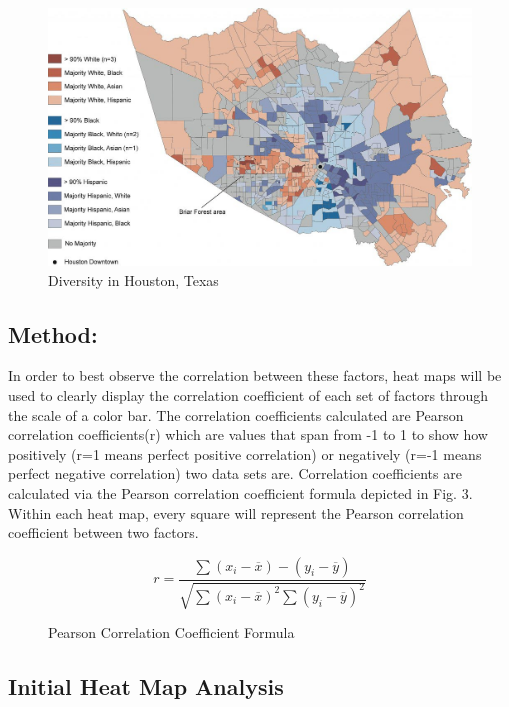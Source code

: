 \documentclass[letterpaper, 10 pt, conference]{ieeeconf}  %
\begin{document}
\begin{figure}
    \centering
    \includegraphics[width=1\linewidth]{Images/map2.jpg}
    \caption{Diversity in Houston, Texas \cite{Binkovitz_2016} }
    \label{fig:enter-label}
\end{figure}

\subsection{Method:}
In order to best observe the correlation between these factors, heat maps will be used to clearly display the correlation coefficient of each set of factors through the scale of a color bar. The correlation coefficients calculated are Pearson correlation coefficients(r) which are values that span from -1 to 1 to show how positively (r=1 means perfect positive correlation) or negatively (r=-1 means perfect negative correlation) two data sets are. Correlation coefficients are calculated via the Pearson correlation coefficient formula depicted in Fig. 3. Within each heat map, every square will represent the Pearson correlation coefficient between two factors. \par

\begin{figure}
    \begin{equation*}
    r=\frac{\sum ( x_{i} -\overline{x}) -( y_{i} -\overline{y})}{\sqrt{\sum ( x_{i} -\overline{x})^{2}\sum ( y_{i} -\overline{y})^{2}}}
    \end{equation*}
    \caption{Pearson Correlation Coefficient Formula \cite{WEBB_2021}}
    \label{fig:enter-label}
\end{figure}


\subsection{Initial Heat Map Analysis}
\end{document}
